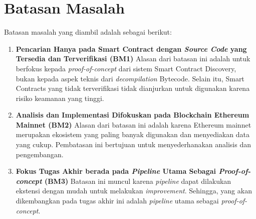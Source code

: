 \section{Batasan Masalah}
\label{sec:batasan-masalah}


Batasan masalah yang diambil adalah sebagai berikut:

\begin{enumerate}
	\item \textbf{Pencarian Hanya pada Smart Contract dengan \textit{Source Code} yang Tersedia dan Terverifikasi (BM1)} \newline
	      Alasan dari batasan ini adalah untuk berfokus kepada \textit{proof-of-concept} dari sistem Smart Contract Discovery, bukan kepada aspek teknis dari \textit{decompilation} Bytecode. Selain itu, Smart Contracts yang tidak terverifikasi tidak dianjurkan untuk digunakan karena risiko keamanan yang tinggi.
	
		  \item \textbf{Analisis dan Implementasi Difokuskan pada Blockchain Ethereum Mainnet (BM2)} \newline
	      Alasan dari batasan ini adalah karena Ethereum mainnet merupakan ekosistem yang paling banyak digunakan dan menyediakan data yang cukup. Pembatasan ini bertujuan untuk menyederhanakan analisis dan pengembangan.

	\item \textbf{Fokus Tugas Akhir berada pada \textit{Pipeline} Utama Sebagai \textit{Proof-of-concept} (BM3)} \newline
	      Batasan ini muncul karena \textit{pipeline} dapat dilakukan ekstensi dengan mudah untuk melakukan \textit{improvement}. Sehingga, yang akan dikembangkan pada tugas akhir ini adalah \textit{pipeline} utama sebagai \textit{proof-of-concept}.
\end{enumerate}
